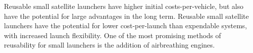   Reusable small satellite launchers have higher initial costs-per-vehicle, but also have the potential for large advantages in the long term\cite{Preller2017}. Reusable small satellite launchers have the potential for lower cost-per-launch than expendable systems, with increased launch flexibility\cite{Preller2017}. 
 One of the most promising methods of reusability for small launchers is the addition of airbreathing engines\cite{Smart2009}.

   

  
  

  
  \begin{landscape}%
  	\begin{table}
  		
  		\begin{tabularx}{\linewidth}{|X|X|X|X|X|X|X|X|}
  			

\end{tabularx}
\end{table}
\end{landscape}
